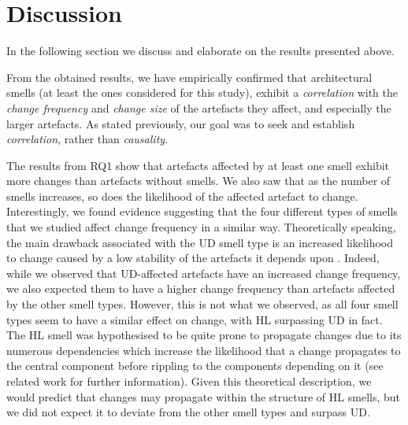 \section{Discussion}\label{c5:sec:discussion}
In the following section we discuss and elaborate on the results presented above.

From the obtained results, we have empirically confirmed that architectural smells (at least the ones considered for this study), exhibit a \emph{correlation} with the \emph{change frequency} and \emph{change size} of the artefacts they affect, and especially the larger artefacts.
As stated previously, our goal was to seek and establish \emph{correlation}, rather than \emph{causality}.

The results from RQ1 show that artefacts affected by at least one smell exhibit more changes than artefacts without smells. We also saw that as the number of smells increases, so does the likelihood of the affected artefact to change. 
Interestingly, we found evidence suggesting that the four different types of smells that we studied affect change frequency in a similar way. 
Theoretically speaking, the main drawback associated with the UD smell type \cite{Arcelli2016} is an increased likelihood to change caused by a low stability of the artefacts it depends upon \cite{Martin2018}.
Indeed, while we observed that UD-affected artefacts have an increased change frequency, we also expected them to have a higher change frequency than artefacts affected by the other smell types. However, this is not what we observed, as all four smell types seem to have a similar effect on change, with HL surpassing UD in fact.
The HL smell was hypothesised to be quite prone to propagate changes due to its numerous dependencies which increase the likelihood that a change propagates to the central component before rippling to the components depending on it (see related work \cite{Sas2019} for further information).
Given this theoretical description, we would predict that changes may propagate within the structure of HL smells, but we did not expect it to deviate from the other smell types and surpass UD.



